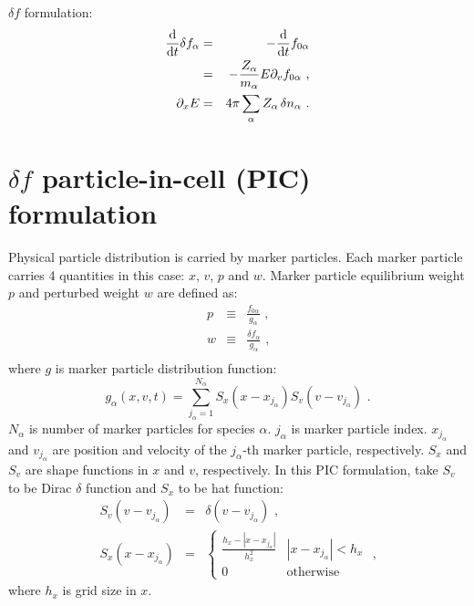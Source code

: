 \documentclass[12pt]{article}
\begin{document}
$\delta f$ formulation:
\begin{eqnarray}
	\frac{\mathrm{d}}{\mathrm{d} t} \delta f_{\alpha} & = & - \frac{\mathrm{d}}{\mathrm{d} t} f_{0 \alpha} \nonumber \\
	& = & - \frac{Z_\alpha}{m_\alpha} E \partial_v f_{0 \alpha} \textrm{ ,} \\
	\partial_x E & = & 4 \pi \sum_\alpha Z_\alpha \,\delta n_\alpha \textrm{ .}
\end{eqnarray}


\section{$\delta f$ particle-in-cell (PIC) formulation}
\label{sec:df_pic}

Physical particle distribution is carried by marker particles.
Each marker particle carries 4 quantities in this case: $x$, $v$, $p$ and $w$.
Marker particle equilibrium weight $p$ and perturbed weight $w$ are defined as:
\begin{eqnarray}
	p & \equiv & \frac{f_{0 \alpha}}{g_\alpha} \textrm{ ,} \\
	w & \equiv & \frac{\delta f_\alpha}{g_\alpha} \textrm{ ,} \\
\end{eqnarray}
where $g$ is marker particle distribution function:
\begin{equation}
	g_\alpha(x, v, t) = \sum_{j_\alpha = 1}^{N_\alpha} S_x(x - x_{j_\alpha}) S_v(v - v_{j_\alpha}) \textrm{ .}
\end{equation}
$N_\alpha$ is number of marker particles for species $\alpha$.
$j_\alpha$ is marker particle index.
$x_{j_\alpha}$ and $v_{j_\alpha}$ are position and velocity of the $j_{\alpha}$-th marker particle, respectively.
$S_x$ and $S_v$ are shape functions in $x$ and $v$, respectively.
In this PIC formulation, take $S_v$ to be Dirac $\delta$ function and $S_x$ to be hat function:
\begin{eqnarray}
	S_v(v - v_{j_\alpha}) & = & \delta(v - v_{j_\alpha}) \textrm{ ,} \\
	S_x(x - x_{j_\alpha}) & = & \left\{ \begin{array}{ll}
		\frac{h_x - |x - x_{j_\alpha}|}{h_x^2} & |x - x_{j_\alpha}| < h_x \\
		0 & \textrm{otherwise}
	\end{array} \right. \textrm{ ,}
\end{eqnarray}
where $h_x$ is grid size in $x$.
\end{document}
